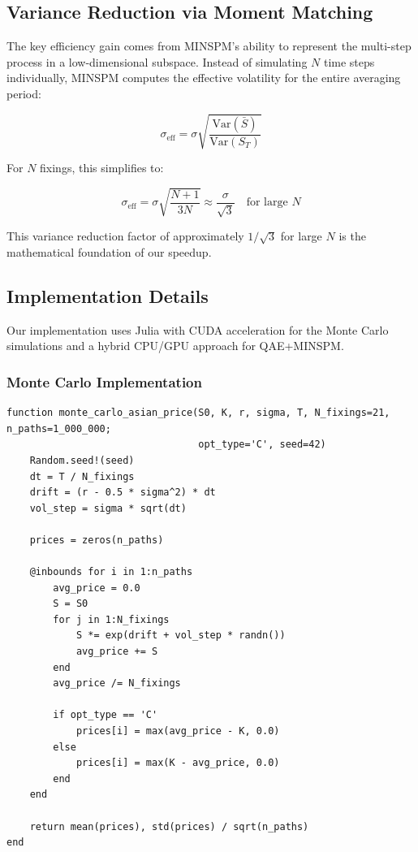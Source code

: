 \documentclass[12pt]{article}
\begin{document}
\subsection{Variance Reduction via Moment Matching}

The key efficiency gain comes from MINSPM's ability to represent the multi-step process in a low-dimensional subspace. Instead of simulating $N$ time steps individually, MINSPM computes the effective volatility for the entire averaging period:

\begin{equation}
\sigma_{\text{eff}} = \sigma \sqrt{\frac{\text{Var}(\bar{S})}{\text{Var}(S_T)}}
\end{equation}

For $N$ fixings, this simplifies to:

\begin{equation}
\sigma_{\text{eff}} = \sigma \sqrt{\frac{N+1}{3N}} \approx \frac{\sigma}{\sqrt{3}} \quad \text{for large } N
\end{equation}

This variance reduction factor of approximately $1/\sqrt{3}$ for large $N$ is the mathematical foundation of our speedup.

\subsection{Implementation Details}

Our implementation uses Julia with CUDA acceleration for the Monte Carlo simulations and a hybrid CPU/GPU approach for QAE+MINSPM.

\subsubsection{Monte Carlo Implementation}

\begin{verbatim}
function monte_carlo_asian_price(S0, K, r, sigma, T, N_fixings=21, n_paths=1_000_000;
                                 opt_type='C', seed=42)
    Random.seed!(seed)
    dt = T / N_fixings
    drift = (r - 0.5 * sigma^2) * dt
    vol_step = sigma * sqrt(dt)
    
    prices = zeros(n_paths)
    
    @inbounds for i in 1:n_paths
        avg_price = 0.0
        S = S0
        for j in 1:N_fixings
            S *= exp(drift + vol_step * randn())
            avg_price += S
        end
        avg_price /= N_fixings
        
        if opt_type == 'C'
            prices[i] = max(avg_price - K, 0.0)
        else
            prices[i] = max(K - avg_price, 0.0)
        end
    end
    
    return mean(prices), std(prices) / sqrt(n_paths)
end
\end{verbatim}
\end{document}
